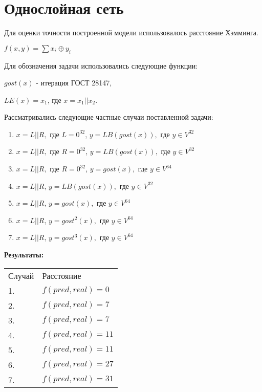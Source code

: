 \documentclass[a4paper,12pt,twoside]{article}
\begin{document}
	\section{Однослойная сеть}
	
	Для оценки точности построенной модели использовалось расстояние Хэмминга.
	
	$f(x, y) = \sum x_i \oplus y_i$

	\bigskip

	\noindent  Для обозначения задачи использовались следующие функции:
	
	$gost(x)$ - итерация ГОСТ 28147,
		
		\bigskip
		
	$LE(x) = x_1$, где $x = x_1 || x_2$.
	
	\bigskip
	\noindent Рассматривались следующие частные случаи поставленной задачи:
	
	\begin{enumerate}
		\item $x = L || R,$ где $L = 0^{32}$, $y=LB(gost(x)),$ где $y \in V^{32}$
		\item $x = L || R,$ где $R = 0^{32}$, $y=LB(gost(x)),$ где $y \in V^{32}$
		\item $x = L || R,$ где $R = 0^{32}$, $y=gost(x),$ где  $y \in V^{64}$
		\item $x = L || R$, $y=LB(gost(x)),$ где  $y \in V^{32}$
		\item $x = L || R$, $y=gost(x),$ где $y \in V^{64}$
		\item $x = L || R$, $y=gost^2(x),$ где $y \in V^{64}$
		\item $x = L || R$, $y=gost^3(x),$ где $y \in V^{64}$
	\end{enumerate}
	
	\noindent\textbf{Результаты:}
	
	\bigskip	
	
		\begin{table}[ht!]
			\begin{tabular}{ll}
				Случай &  Расстояние \\
				1. &  $f(pred, real) = 0$\\
				2. &  $f(pred, real) = 7$\\
				3. &  $f(pred, real) = 7$\\
				4. &  $f(pred, real) = 11$\\
				5. &  $f(pred, real) = 11$\\
				6. &  $f(pred, real) = 27$\\
				7. &  $f(pred, real) = 31$\\
			\end{tabular}
		\end{table}
	
\end{document}
